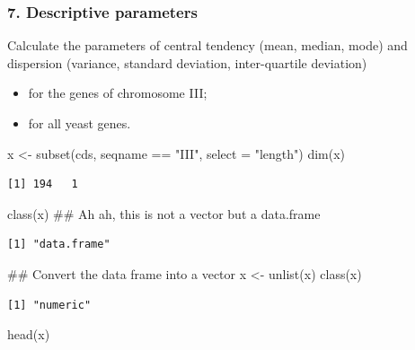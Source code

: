 \documentclass[]{article}
\newenvironment{Shaded}{\begin{snugshade}}{\end{snugshade}}
\newcommand{\KeywordTok}[1]{\textcolor[rgb]{0.94,0.87,0.69}{#1}}
\newcommand{\DataTypeTok}[1]{\textcolor[rgb]{0.87,0.87,0.75}{#1}}
\newcommand{\StringTok}[1]{\textcolor[rgb]{0.80,0.58,0.58}{#1}}
\newcommand{\OperatorTok}[1]{\textcolor[rgb]{0.94,0.94,0.82}{#1}}
\newcommand{\NormalTok}[1]{\textcolor[rgb]{0.80,0.80,0.80}{#1}}
\providecommand{\tightlist}{%
  \setlength{\itemsep}{0pt}\setlength{\parskip}{0pt}}
\begin{document}
\subsubsection{7. Descriptive parameters}\label{descriptive-parameters}

Calculate the parameters of central tendency (mean, median, mode) and
dispersion (variance, standard deviation, inter-quartile deviation)

\begin{itemize}
\tightlist
\item
  for the genes of chromosome III;
\item
  for all yeast genes.
\end{itemize}

\begin{Shaded}
\begin{Highlighting}[]
\NormalTok{x <-}\StringTok{ }\KeywordTok{subset}\NormalTok{(cds, seqname }\OperatorTok{==}\StringTok{ "III"}\NormalTok{, }\DataTypeTok{select =} \StringTok{"length"}\NormalTok{)}
\KeywordTok{dim}\NormalTok{(x) }
\end{Highlighting}
\end{Shaded}

\begin{verbatim}
[1] 194   1
\end{verbatim}

\begin{Shaded}
\begin{Highlighting}[]
\KeywordTok{class}\NormalTok{(x) ## Ah ah, this is not a vector but a data.frame}
\end{Highlighting}
\end{Shaded}

\begin{verbatim}
[1] "data.frame"
\end{verbatim}

\begin{Shaded}
\begin{Highlighting}[]
\NormalTok{## Convert the data frame into a vector}
\NormalTok{x <-}\StringTok{ }\KeywordTok{unlist}\NormalTok{(x)}
\KeywordTok{class}\NormalTok{(x)}
\end{Highlighting}
\end{Shaded}

\begin{verbatim}
[1] "numeric"
\end{verbatim}

\begin{Shaded}
\begin{Highlighting}[]
\KeywordTok{head}\NormalTok{(x)}
\end{Highlighting}
\end{Shaded}
\end{document}
